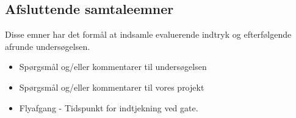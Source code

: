 \subsection{Afsluttende samtaleemner} 
Disse emner har det formål at indsamle evaluerende indtryk og efterfølgende afrunde undersøgelsen.
%
\begin{itemize}
\item Spørgsmål og/eller kommentarer til undersøgelsen 
\item Spørgsmål og/eller kommentarer til vores projekt
\item Flyafgang - Tidspunkt for indtjekning ved gate. 
\end{itemize}

